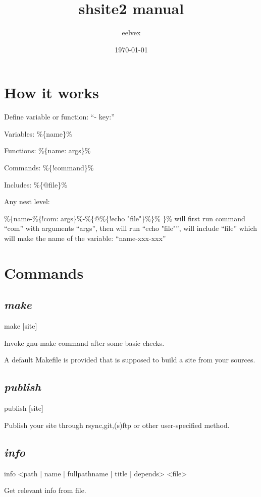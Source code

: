\documentclass{memoir}
\title{shsite2 manual}
\author{eelvex}
\date{\today}
\newcommand{\var}[1]{\%\{#1\}\%}
\begin{document}
\begin{titlingpage}
\maketitle
\end{titlingpage}
\tableofcontents

\chapter{How it works} %

Define variable or function: ``- key:''

Variables: \var{name}

Functions: \var{name: args}

Commands: \var{!command}

Includes:  \var{@file}

Any nest level:

\var{name-\var{!com: args}-\var{@\var{!echo "file"}} }
will first run command ``com'' with arguments ``args'', then will run ``echo "file"'', will include ``file''
which will make the name of the variable: ``name-xxx-xxx''




\chapter{Commands} %

	\section{\emph{make}} %
	make [site]

	Invoke gnu-make command after some basic checks.

	A default Makefile is provided that is supposed to build a site from your sources.
	\section{\emph{publish}} %
	publish [site]

	Publish your site through rsync,git,(s)ftp or other user-specified method.
	\section{\emph{info}}
	info <path | name | fullpathname | title | depends> <file>

	Get relevant info from file.
\end{document}
